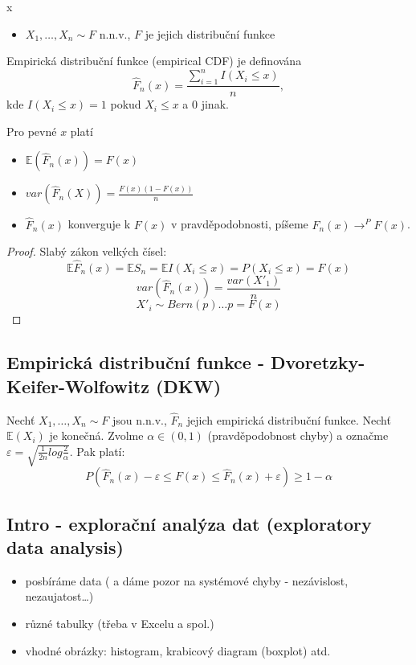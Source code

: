 \documentclass[../main.tex]{subfiles}
\begin{document}
\begin{example}
    {\color{white} x}
    \begin{itemize}
        \item $X_1,\dots,X_n \sim F$ n.n.v., $F$ je jejich distribuční funkce
    \end{itemize}
    \begin{definition}
        Empirická distribuční funkce (empirical CDF) je definována
        \[\hat{F}_n(x) = \frac{\sum^n_{i=1}I(X_i \leq x)}{n},\]
        kde $I(X_i \leq x) = 1$ pokud $X_i \leq x$ a 0 jinak.
    \end{definition}
\end{example}

\begin{theorem}
    Pro pevné $x$ platí
    \begin{itemize}
        \item $\mathbb{E}(\hat{F}_n(x)) = F(x)$
        \item $var(\hat{F}_n(X)) = \frac{F(x)(1-F(x))}{n}$
        \item $\hat{F}_n(x)$ konverguje k $F(x)$ v pravděpodobnosti, píšeme $\hat{F}_n(x)\rightarrow^P F(x)$.
    \end{itemize}
    \begin{proof}
        Slabý zákon velkých čísel:
        \[\mathbb{E}\hat{F}_n(x) = \mathbb{E}S_n = \mathbb{E}I(X_i \leq x) = P(X_i \leq x) = F(x)\]
        \[var(\hat{F}_n(x)) = \frac{var(X'_1)}{n}\]
        \[X'_i \sim Bern(p) \dots p=F(x)\]
    \end{proof}
\end{theorem}

\subsection{Empirická distribuční funkce - Dvoretzky-Keifer-Wolfowitz (DKW)}

\begin{theorem}
    Nechť $X_1,\dots,X_n \sim F$ jsou n.n.v., $\hat{F}_n$ jejich empirická distribuční funkce.
    Nechť $\mathbb{E}(X_i)$ je konečná. Zvolme $\alpha \in (0,1)$ (pravděpodobnost chyby) 
    a označme $\varepsilon = \sqrt{\frac{1}{2n}log \frac{2}{\alpha}}$. Pak platí:
    \[P(\hat{F}_n(x) - \varepsilon \leq F(x) \leq \hat{F}_n(x) + \varepsilon)\geq 1-\alpha\]
\end{theorem}

\subsection{Intro - explorační analýza dat (exploratory data analysis)}
\begin{itemize}
    \item posbíráme data ( a dáme pozor na systémové chyby - nezávislost, nezaujatost\dots)
    \item různé tabulky (třeba v Excelu a spol.)
    \item vhodné obrázky: histogram, krabicový diagram (boxplot) atd.
\end{itemize}
\end{document}

